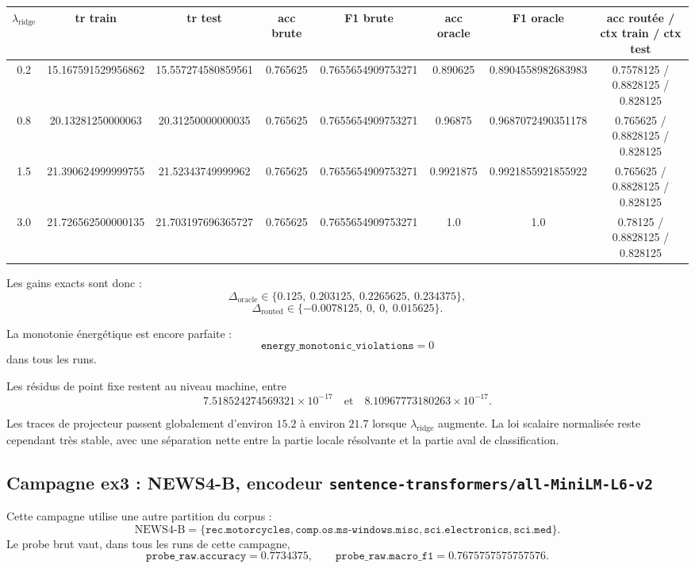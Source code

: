 \begin{center}
\small
\begin{tabular}{c c c c c c c c}
\hline
\(\lambda_{\mathrm{ridge}}\) & tr train & tr test & acc brute & F1 brute & acc oracle & F1 oracle & acc routée / ctx train / ctx test \\
\hline
0.2 & 15.167591529956862 & 15.557274580859561 & 0.765625 & 0.7655654909753271 & 0.890625 & 0.8904558982683983 & 0.7578125 / 0.8828125 / 0.828125 \\
0.8 & 20.13281250000063 & 20.31250000000035 & 0.765625 & 0.7655654909753271 & 0.96875 & 0.9687072490351178 & 0.765625 / 0.8828125 / 0.828125 \\
1.5 & 21.390624999999755 & 21.52343749999962 & 0.765625 & 0.7655654909753271 & 0.9921875 & 0.9921855921855922 & 0.765625 / 0.8828125 / 0.828125 \\
3.0 & 21.726562500000135 & 21.703197696365727 & 0.765625 & 0.7655654909753271 & 1.0 & 1.0 & 0.78125 / 0.8828125 / 0.828125 \\
\hline
\end{tabular}
\end{center}

Les gains exacts sont donc :
\[
\Delta_{\mathrm{oracle}} \in \{0.125,\ 0.203125,\ 0.2265625,\ 0.234375\},
\]
\[
\Delta_{\mathrm{routed}} \in \{-0.0078125,\ 0,\ 0,\ 0.015625\}.
\]

La monotonie énergétique est encore parfaite :
\[
\texttt{energy\_monotonic\_violations}=0
\]
dans tous les runs.

Les résidus de point fixe restent au niveau machine, entre
\[
7.518524274569321\times 10^{-17}
\quad\text{et}\quad
8.10967773180263\times 10^{-17}.
\]

Les traces de projecteur passent globalement d’environ \(15.2\) à environ \(21.7\) lorsque \(\lambda_{\mathrm{ridge}}\) augmente. La loi scalaire normalisée reste cependant très stable, avec une séparation nette entre la partie locale résolvante et la partie aval de classification.

\subsection{Campagne ex3 : NEWS4-B, encodeur \texttt{sentence-transformers/all-MiniLM-L6-v2}}

Cette campagne utilise une autre partition du corpus :
\[
\text{NEWS4-B}=
\{\texttt{rec.motorcycles},\texttt{comp.os.ms-windows.misc},\texttt{sci.electronics},\texttt{sci.med}\}.
\]
Le probe brut vaut, dans tous les runs de cette campagne,
\[
\texttt{probe\_raw.accuracy}=0.7734375,
\qquad
\texttt{probe\_raw.macro\_f1}=0.7675757575757576.
\]

